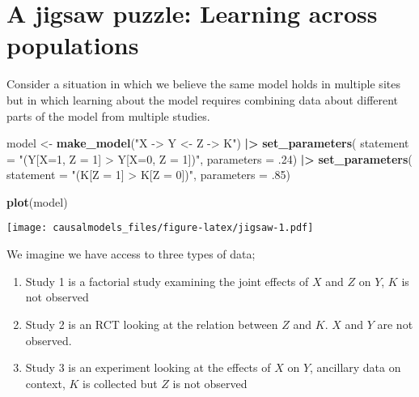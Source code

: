 \documentclass[
  12pt,
]{book}
\newenvironment{Shaded}{\begin{snugshade}}{\end{snugshade}}
\newcommand{\AttributeTok}[1]{\textcolor[rgb]{0.13,0.29,0.53}{#1}}
\newcommand{\DecValTok}[1]{\textcolor[rgb]{0.00,0.00,0.81}{#1}}
\newcommand{\FunctionTok}[1]{\textcolor[rgb]{0.13,0.29,0.53}{\textbf{#1}}}
\newcommand{\NormalTok}[1]{#1}
\newcommand{\OtherTok}[1]{\textcolor[rgb]{0.56,0.35,0.01}{#1}}
\newcommand{\SpecialCharTok}[1]{\textcolor[rgb]{0.81,0.36,0.00}{\textbf{#1}}}
\newcommand{\StringTok}[1]{\textcolor[rgb]{0.31,0.60,0.02}{#1}}
\providecommand{\tightlist}{%
  \setlength{\itemsep}{0pt}\setlength{\parskip}{0pt}}
\begin{document}
\hypertarget{a-jigsaw-puzzle-learning-across-populations}{%
\section{A jigsaw puzzle: Learning across populations}\label{a-jigsaw-puzzle-learning-across-populations}}

Consider a situation in which we believe the same model holds in multiple sites but in which learning about the model requires combining data about different parts of the model from multiple studies.

\begin{Shaded}
\begin{Highlighting}[]
\NormalTok{model }\OtherTok{\textless{}{-}} 
  \FunctionTok{make\_model}\NormalTok{(}\StringTok{"X {-}\textgreater{} Y \textless{}{-} Z {-}\textgreater{} K"}\NormalTok{) }\SpecialCharTok{|\textgreater{}}
  \FunctionTok{set\_parameters}\NormalTok{(}
    \AttributeTok{statement =} \StringTok{"(Y[X=1, Z = 1] \textgreater{} Y[X=0, Z = 1])"}\NormalTok{, }\AttributeTok{parameters =}\NormalTok{ .}\DecValTok{24}\NormalTok{) }\SpecialCharTok{|\textgreater{}}
  \FunctionTok{set\_parameters}\NormalTok{(}
    \AttributeTok{statement =} \StringTok{"(K[Z = 1] \textgreater{} K[Z = 0])"}\NormalTok{, }\AttributeTok{parameters =}\NormalTok{ .}\DecValTok{85}\NormalTok{)}


\FunctionTok{plot}\NormalTok{(model)}
\end{Highlighting}
\end{Shaded}

\texttt{[image: causalmodels\_files/figure-latex/jigsaw-1.pdf]}

We imagine we have access to three types of data;

\begin{enumerate}
\def\labelenumi{\arabic{enumi}.}
\tightlist
\item
  Study 1 is a factorial study examining the joint effects of \(X\) and \(Z\) on \(Y\), \(K\) is not observed
\item
  Study 2 is an RCT looking at the relation between \(Z\) and \(K\). \(X\) and \(Y\) are not observed.
\item
  Study 3 is an experiment looking at the effects of \(X\) on \(Y\), ancillary data on context, \(K\) is collected but \(Z\) is not observed
\end{enumerate}
\end{document}
